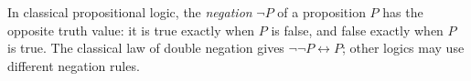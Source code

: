 
In classical propositional logic, the \emph{negation} $\neg P$ of a proposition $P$ has the opposite truth value: it is true exactly when $P$ is false, and false exactly when $P$ is true. The classical law of double negation gives $\neg\neg P\leftrightarrow P$; other logics may use different negation rules.
